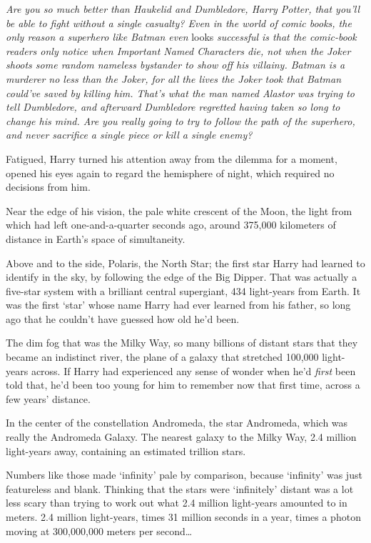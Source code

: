 \emph{Are you so much better than Haukelid and Dumbledore, Harry Potter, that 
you'll be able to fight without a single casualty? Even in the world of comic 
books, the only reason a superhero like Batman even} looks \emph{successful is 
that the comic-book readers only notice when Important Named Characters die, 
not when the Joker shoots some random nameless bystander to show off his 
villainy. Batman is a murderer no less than the Joker, for all the lives the 
Joker took that Batman could've saved by killing him. That's what the man named 
Alastor was trying to tell Dumbledore, and afterward Dumbledore regretted 
having taken so long to change his mind. Are you really going to try to follow 
the path of the superhero, and never sacrifice a single piece or kill a single 
enemy?}

Fatigued, Harry turned his attention away from the dilemma for a moment, opened 
his eyes again to regard the hemisphere of night, which required no decisions 
from him.

Near the edge of his vision, the pale white crescent of the Moon, the light 
from which had left one-and-a-quarter seconds ago, around 375,000 kilometers of 
distance in Earth's space of simultaneity.

Above and to the side, Polaris, the North Star; the first star Harry had 
learned to identify in the sky, by following the edge of the Big Dipper. That 
was actually a five-star system with a brilliant central supergiant, 434 
light-years from Earth. It was the first `star' whose name Harry had ever 
learned from his father, so long ago that he couldn't have guessed how old he'd 
been.

The dim fog that was the Milky Way, so many billions of distant stars that they 
became an indistinct river, the plane of a galaxy that stretched 100,000 
light-years across. If Harry had experienced any sense of wonder when he'd 
\emph{first} been told that, he'd been too young for him to remember now that 
first time, across a few years' distance.

In the center of the constellation Andromeda, the star Andromeda, which was 
really the Andromeda Galaxy. The nearest galaxy to the Milky Way, 2.4 million 
light-years away, containing an estimated trillion stars.

Numbers like those made `infinity' pale by comparison, because `infinity' was 
just featureless and blank. Thinking that the stars were `infinitely' distant 
was a lot less scary than trying to work out what 2.4 million light-years 
amounted to in meters. 2.4 million light-years, times 31 million seconds in a 
year, times a photon moving at 300,000,000 meters per second{\ldots}

